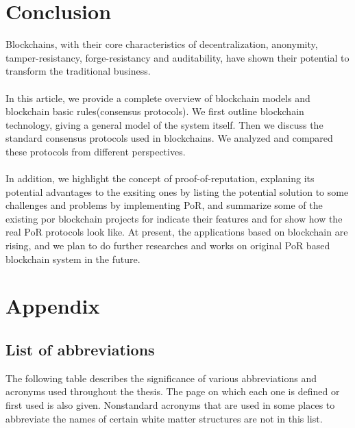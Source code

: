 \documentclass[]{article}
\begin{document}
\begin{CJK*}{UTF8}{gbsn}
	\paragraph{}
	\section{Conclusion}
	Blockchains, with their core characteristics of decentralization, anonymity, tamper-resistancy, forge-resistancy and auditability, have shown their potential to transform the traditional business. 
	\paragraph{}	
	In this article, we provide a complete overview of blockchain models and blockchain basic rules(consensus protocols). We first outline blockchain technology, giving a general model of the system itself. Then we discuss the standard consensus protocols used in blockchains. We analyzed and compared these protocols from different perspectives. 
	\paragraph{}
	In addition, we highlight the concept of proof-of-reputation, explaning its potential advantages to the exsiting ones by listing the potential solution to some challenges and problems by implementing PoR, and summarize some of the existing por blockchain projects for indicate their features and for show how the real PoR protocols look like. At present, the applications based on blockchain are rising, and we plan to do further researches and works on original PoR based blockchain system in the future.
	
\section*{Appendix}
\subsection*{List of abbreviations}
The following table describes the significance of various abbreviations and acronyms used throughout the thesis. The page on which each one is defined or first used is also given. Nonstandard acronyms that are used in some places to abbreviate the names of certain white matter structures are not in this list.


\end{CJK*}
\end{document}
